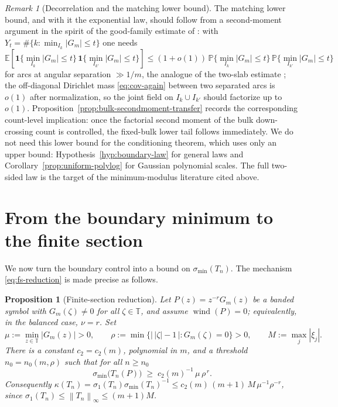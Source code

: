 \documentclass[11pt]{amsart}
\numberwithin{equation}{section}
\newtheorem{proposition}[theorem]{Proposition}
\theoremstyle{definition}
\theoremstyle{remark}
\newtheorem{remark}[theorem]{Remark}
\newcommand{\T}{\mathbb T}
\newcommand{\Prob}{\mathbb P}
\newcommand{\Exp}{\mathbb E}
\newcommand{\wind}{\operatorname{wind}}
\newcommand{\smin}{\sigma_{\min}}
\newcommand{\kdn}{\kappa}
\newcommand{\norm}[1]{\left\lVert #1\right\rVert}
\newcommand{\abs}[1]{\left\lvert #1\right\rvert}
\begin{document}
\begin{remark}[Decorrelation and the matching lower bound]\label{rem:decorrelation}
The matching lower bound, and with it the exponential law, should follow from a second-moment argument in the spirit of the good-family estimate of \cite{PhaseRetrieval}: with $Y_t=\#\{k:\min_{I_k}\abs{G_m}\le t\}$ one needs
\begin{equation}\label{eq:pair-decorrelation}
  \Exp[\mathbf1\{\min_{I_k}\abs{G_m}\le t\}\,\mathbf1\{\min_{I_{k'}}\abs{G_m}\le t\}]
  \le (1+o(1))\,\Prob\{\min_{I_k}\abs{G_m}\le t\}\,\Prob\{\min_{I_{k'}}\abs{G_m}\le t\}
\end{equation}
for arcs at angular separation $\gg1/m$, the analogue of the two-slab estimate \cite[Lem.~4.3]{PhaseRetrieval}; the off-diagonal Dirichlet mass \eqref{eq:cov-again} between two separated arcs is $o(1)$ after normalization, so the joint field on \(I_k\cup I_{k'}\) should factorize up to \(o(1)\). Proposition~\ref{prop:bulk-secondmoment-transfer} records the corresponding count-level implication: once the factorial second moment of the bulk down-crossing count is controlled, the fixed-bulk lower tail follows immediately. We do not need this lower bound for the conditioning theorem, which uses only an upper bound: Hypothesis~\ref{hyp:boundary-law} for general laws and Corollary~\ref{prop:uniform-polylog} for Gaussian polynomial scales. The full two-sided law is the target of the minimum-modulus literature cited above.
\end{remark}

\section{From the boundary minimum to the finite section}\label{sec:main}

We now turn the boundary control into a bound on $\smin(T_n)$. The mechanism \eqref{eq:fs-reduction} is made precise as follows.

\begin{proposition}[Finite-section reduction]\label{prop:fs}
Let $P(z)=z^{-r}G_m(z)$ be a banded symbol with $G_m(\zeta)\ne0$ for all $\zeta\in\T$, and assume \(\wind(P)=0\); equivalently, in the balanced case, \(\nu=r\). Set
\[
  \mu:=\min_{z\in\T}\abs{G_m(z)}>0,
  \qquad
  \rho:=\min\bigl\{\bigl|\,\abs\zeta-1\,\bigr|:G_m(\zeta)=0\bigr\}>0,
  \qquad
  M:=\max_j\abs{\xi_j}.
\]
There is a constant $c_2=c_2(m)$, polynomial in $m$, and a threshold $n_0=n_0(m,\rho)$ such that for all $n\ge n_0$
\begin{equation}\label{eq:fs-precise}
  \smin\bigl(T_n(P)\bigr)\;\ge\;c_2(m)^{-1}\,\mu\,\rho^{\,r}.
\end{equation}
Consequently $\kdn(T_n)=\sigma_1(T_n)\smin(T_n)^{-1}\le c_2(m)\,(m+1)\,M\,\mu^{-1}\rho^{-r}$, since $\sigma_1(T_n)\le\norm{T_n}_\infty\le(m+1)M$.
\end{proposition}
\end{document}

